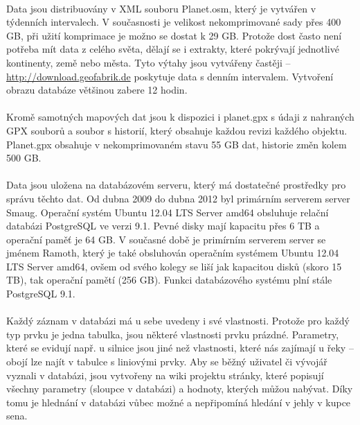\documentclass[11pt,a4paper,titlepage,oneside]{book}
\begin{document}
		\paragraph{} Data jsou distribuovány v XML souboru Planet.osm, který je vytvářen v týdenních intervalech. V současnosti je velikost nekomprimované sady přes 400 GB, při užití komprimace je možno se dostat k 29 GB. Protože dost často není potřeba mít data z celého světa, dělají se i extrakty, které pokrývají jednotlivé kontinenty, země nebo města. Tyto výtahy jsou vytvářeny častěji -- \url{http://download.geofabrik.de} poskytuje data s denním intervalem. Vytvoření obrazu databáze většinou zabere 12 hodin\cite{planet.osm}.
	\paragraph{} Kromě samotných mapových dat jsou k dispozici i planet.gpx s údaji z nahraných GPX souborů a soubor s historií, který obsahuje každou revizi každého objektu. Planet.gpx obsahuje v nekomprimovaném stavu 55 GB dat, historie změn kolem 500 GB. 
	\paragraph{} Data jsou uložena na databázovém serveru, který má dostatečné prostředky pro správu těchto dat. Od dubna 2009 do dubna 2012 byl primárním serverem server Smaug. Operační systém Ubuntu 12.04 LTS Server amd64 obsluhuje relační databázi PostgreSQL ve verzi 9.1. Pevné disky mají kapacitu přes 6 TB a operační paměť je 64 GB. V současné době je primírním serverem server se jménem Ramoth, který je také obsluhován operačním systémem Ubuntu 12.04 LTS Server amd64, ovšem od svého kolegy se liší jak kapacitou disků (skoro 15 TB), tak operační pamětí (256 GB). Funkci databázového systému plní stále PostgreSQL 9.1.
	\paragraph{}Každý záznam v databázi má u sebe uvedeny i své vlastnosti. Protože pro každý typ prvku je jedna tabulka, jsou některé vlastnosti prvku prázdné. Parametry, které se evidují např. u silnice jsou jiné než vlastnosti, které nás zajímají u řeky -- obojí lze najít v tabulce s liniovými prvky. Aby se běžný uživatel či vývojář vyznali v databázi, jsou vytvořeny na wiki projektu stránky, které popisují všechny parametry (sloupce v databázi) a hodnoty, kterých můžou nabývat. Díky tomu je hlednání v databázi vůbec možné a nepřipomíná hledání v jehly v kupce sena.
\end{document}
